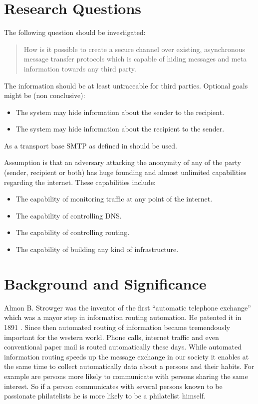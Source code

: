 \documentclass[twocolumn,a4paper,10pt,english]{scrartcl}
\newenvironment{myitemize}{\begin{itemize}\setlength{\itemsep}{0em}}{\end{itemize}}
\begin{document}
\section{Research Questions}
The following question should be investigated: 
\begin{quote}
How is it possible to create a secure channel over existing, asynchronous message transfer protocols which is capable of hiding messages and meta information towards any third party. 
\end{quote}
The information should be at least untraceable for third parties. Optional goals might be (non conclusive):
\begin{myitemize}
\item The system may hide information about the sender to the recipient.
\item The system may hide information about the recipient to the sender. 
\end{myitemize}
As a transport base SMTP as defined in \cite{RFC5321} should be used. \par
Assumption is that an adversary attacking the anonymity of any of the party (sender, recipient or both) has huge founding and almost unlimited capabilities regarding the internet. These capabilities include:
\begin{myitemize}
\item The capability of monitoring traffic at any point of the internet.
\item The capability of controlling DNS.
\item The capability of controlling routing.
\item The capability of building any kind of infrastructure.
\end{myitemize}

\section{Background and Significance}
Almon B. Strowger was the inventor of the first ``automatic telephone exchange'' which was a mayor step in information routing automation. He patented it in 1891 \cite{strowger}. Since then automated routing of information became tremendously important for the western world. Phone calls, internet traffic and even conventional paper mail is routed automatically these days. While automated information routing speeds up the message exchange in our society it enables at the same time to collect automatically data about a persons and their habits. For example are persons more likely to communicate with persons sharing the same interest. So if a person communicates with several persons known to be passionate philatelists he is more likely to be a philatelist himself.\par
\end{document}
